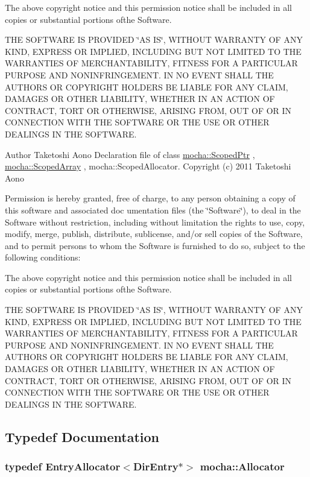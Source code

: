 The above copyright notice and this permission notice shall be included in all copies or substantial portions ofthe Software.

THE SOFTWARE IS PROVIDED \char`\"{}AS IS\char`\"{}, WITHOUT WARRANTY OF ANY KIND, EXPRESS OR IMPLIED, INCLUDING BUT NOT LIMITED TO THE WARRANTIES OF MERCHANTABILITY, FITNESS FOR A PARTICULAR PURPOSE AND NONINFRINGEMENT. IN NO EVENT SHALL THE AUTHORS OR COPYRIGHT HOLDERS BE LIABLE FOR ANY CLAIM, DAMAGES OR OTHER LIABILITY, WHETHER IN AN ACTION OF CONTRACT, TORT OR OTHERWISE, ARISING FROM, OUT OF OR IN CONNECTION WITH THE SOFTWARE OR THE USE OR OTHER DEALINGS IN THE SOFTWARE.

\begin{DoxyAuthor}{Author}
Taketoshi Aono  Declaration file of class \hyperlink{classmocha_1_1_scoped_ptr}{mocha::ScopedPtr} , \hyperlink{classmocha_1_1_scoped_array}{mocha::ScopedArray} , mocha::ScopedAllocator. Copyright (c) 2011 Taketoshi Aono
\end{DoxyAuthor}
Permission is hereby granted, free of charge, to any person obtaining a copy of this software and associated doc umentation files (the \char`\"{}Software\char`\"{}), to deal in the Software without restriction, including without limitation the rights to use, copy, modify, merge, publish, distribute, sublicense, and/or sell copies of the Software, and to permit persons to whom the Software is furnished to do so, subject to the following conditions:

The above copyright notice and this permission notice shall be included in all copies or substantial portions ofthe Software.

THE SOFTWARE IS PROVIDED \char`\"{}AS IS\char`\"{}, WITHOUT WARRANTY OF ANY KIND, EXPRESS OR IMPLIED, INCLUDING BUT NOT LIMITED TO THE WARRANTIES OF MERCHANTABILITY, FITNESS FOR A PARTICULAR PURPOSE AND NONINFRINGEMENT. IN NO EVENT SHALL THE AUTHORS OR COPYRIGHT HOLDERS BE LIABLE FOR ANY CLAIM, DAMAGES OR OTHER LIABILITY, WHETHER IN AN ACTION OF CONTRACT, TORT OR OTHERWISE, ARISING FROM, OUT OF OR IN CONNECTION WITH THE SOFTWARE OR THE USE OR OTHER DEALINGS IN THE SOFTWARE. 

\subsection{Typedef Documentation}
\hypertarget{namespacemocha_a9daacf52e373b6cf0a7d9fa5fa99420e}{
\subsubsection[{Allocator}]{\setlength{\rightskip}{0pt plus 5cm}typedef {\bf EntryAllocator}$<${\bf DirEntry}$\ast$$>$ {\bf mocha::Allocator}}}
\label{namespacemocha_a9daacf52e373b6cf0a7d9fa5fa99420e}


